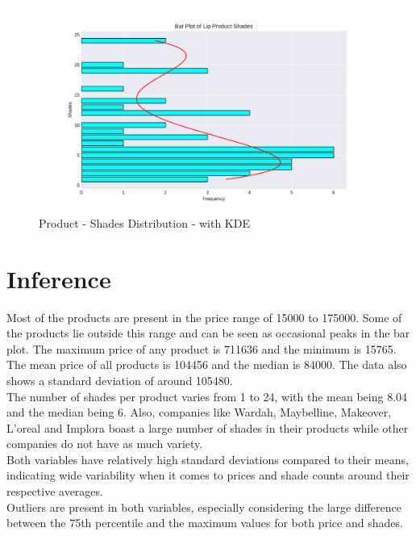 \documentclass{article}
\begin{document}
\begin{center}
    \begin{figure}[htbp]
        \centering
        \includegraphics[scale=0.6]{../images/KDE_Shades.pdf}
        \caption{Product - Shades Distribution - with KDE}
        \label{KDE_Shades}
    \end{figure}
    \restoregeometry

\end{center}
\restoregeometry

\section{Inference}

Most of the products are present in the price range of 15000 to 175000. Some of the products lie outside this range and can be seen as occasional peaks in the bar plot. The maximum price of any product is 711636 and the minimum is 15765. The mean price of all products is 104456 and the median is 84000. The data also shows a standard deviation of around 105480. \\

\noindent The number of shades per product varies from 1 to 24, with the mean being 8.04 and the median being 6. Also, companies like Wardah, Maybelline, Makeover, L'oreal and Implora boast a large number of shades in their products while other companies do not have as much variety. \\

\noindent Both variables have relatively high standard deviations compared to their means, indicating wide variability when it comes to prices and shade counts around their respective averages. \\

\noindent Outliers are present in both variables, especially considering the large difference between the 75th percentile and the maximum values for both price and shades. \\
\end{document}
